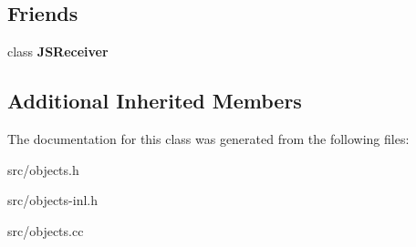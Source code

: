 \subsection*{Friends}
\begin{DoxyCompactItemize}
\item 
\hypertarget{classv8_1_1internal_1_1_j_s_proxy_a52a8ab6293af62038e1f16e7f27701f2}{}class {\bfseries J\+S\+Receiver}\label{classv8_1_1internal_1_1_j_s_proxy_a52a8ab6293af62038e1f16e7f27701f2}

\end{DoxyCompactItemize}
\subsection*{Additional Inherited Members}


The documentation for this class was generated from the following files\+:\begin{DoxyCompactItemize}
\item 
src/objects.\+h\item 
src/objects-\/inl.\+h\item 
src/objects.\+cc\end{DoxyCompactItemize}
